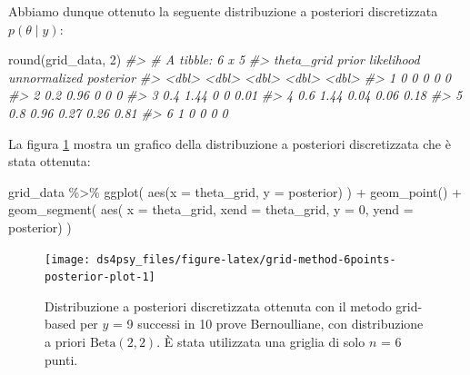 \documentclass[
  11pt,
]{krantz}
\makeatletter
\newenvironment{Shaded}{\begin{snugshade}}{\end{snugshade}}
\newcommand{\AttributeTok}[1]{\textcolor[rgb]{0.61,0.61,0.61}{#1}}
\newcommand{\CommentTok}[1]{\textcolor[rgb]{0.37,0.37,0.37}{\textit{#1}}}
\newcommand{\DecValTok}[1]{\textcolor[rgb]{0.06,0.06,0.06}{#1}}
\newcommand{\FunctionTok}[1]{\textcolor[rgb]{0,0,0}{#1}}
\newcommand{\NormalTok}[1]{#1}
\newcommand{\SpecialCharTok}[1]{\textcolor[rgb]{0,0,0}{#1}}
\newenvironment{kframe}{%
\medskip{}
\setlength{\fboxsep}{.8em}
 \def\at@end@of@kframe{}%
 \ifinner\ifhmode%
  \def\at@end@of@kframe{\end{minipage}}%
  \begin{minipage}{\columnwidth}%
 \fi\fi%
 \def\FrameCommand##1{\hskip\@totalleftmargin \hskip-\fboxsep
 \colorbox{shadecolor}{##1}\hskip-\fboxsep
     \hskip-\linewidth \hskip-\@totalleftmargin \hskip\columnwidth}%
 \MakeFramed {\advance\hsize-\width
   \@totalleftmargin\z@ \linewidth\hsize
   \@setminipage}}%
 {\par\unskip\endMakeFramed%
 \at@end@of@kframe}
\renewenvironment{Shaded}{\begin{kframe}}{\end{kframe}}
\theoremstyle{definition}
\theoremstyle{definition}
\theoremstyle{definition}
\theoremstyle{definition}
\theoremstyle{remark}
\makeatother
\begin{document}
Abbiamo dunque ottenuto la seguente distribuzione a posteriori discretizzata \(p(\theta \mid y)\):

\begin{Shaded}
\begin{Highlighting}[]
\FunctionTok{round}\NormalTok{(grid\_data, }\DecValTok{2}\NormalTok{)}
\CommentTok{\#\textgreater{} \# A tibble: 6 x 5}
\CommentTok{\#\textgreater{}   theta\_grid prior likelihood unnormalized posterior}
\CommentTok{\#\textgreater{}        \textless{}dbl\textgreater{} \textless{}dbl\textgreater{}      \textless{}dbl\textgreater{}        \textless{}dbl\textgreater{}     \textless{}dbl\textgreater{}}
\CommentTok{\#\textgreater{} 1        0    0          0            0         0   }
\CommentTok{\#\textgreater{} 2        0.2  0.96       0            0         0   }
\CommentTok{\#\textgreater{} 3        0.4  1.44       0            0         0.01}
\CommentTok{\#\textgreater{} 4        0.6  1.44       0.04         0.06      0.18}
\CommentTok{\#\textgreater{} 5        0.8  0.96       0.27         0.26      0.81}
\CommentTok{\#\textgreater{} 6        1    0          0            0         0}
\end{Highlighting}
\end{Shaded}

La figura \ref{fig:grid-method-6points-posterior-plot} mostra un grafico della distribuzione a posteriori discretizzata che è stata ottenuta:

\begin{Shaded}
\begin{Highlighting}[]
\NormalTok{grid\_data }\SpecialCharTok{\%\textgreater{}\%} 
  \FunctionTok{ggplot}\NormalTok{(}
    \FunctionTok{aes}\NormalTok{(}\AttributeTok{x =}\NormalTok{ theta\_grid, }\AttributeTok{y =}\NormalTok{ posterior)}
\NormalTok{  ) }\SpecialCharTok{+}
  \FunctionTok{geom\_point}\NormalTok{() }\SpecialCharTok{+}
  \FunctionTok{geom\_segment}\NormalTok{(}
    \FunctionTok{aes}\NormalTok{(}
      \AttributeTok{x =}\NormalTok{ theta\_grid, }
      \AttributeTok{xend =}\NormalTok{ theta\_grid, }
      \AttributeTok{y =} \DecValTok{0}\NormalTok{, }
      \AttributeTok{yend =}\NormalTok{ posterior)}
\NormalTok{  )}
\end{Highlighting}
\end{Shaded}

\begin{figure}[h]

{\centering \texttt{[image: ds4psy\_files/figure-latex/grid-method-6points-posterior-plot-1]} 

}

\caption{Distribuzione a posteriori discretizzata ottenuta con il metodo grid-based per $y$ = 9 successi in 10 prove Bernoulliane, con distribuzione a priori $\mbox{Beta}(2, 2)$. È stata utilizzata una griglia di solo $n$ = 6 punti.}\label{fig:grid-method-6points-posterior-plot}
\end{figure}
\end{document}
